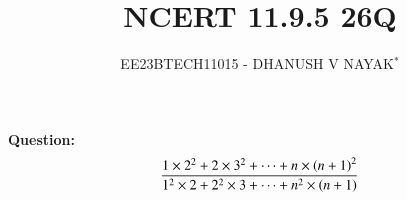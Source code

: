\documentclass[journal,12pt,twocolumn]{IEEEtran}
\theoremstyle{remark}
\begin{document}

\vspace{3cm}

\title{NCERT 11.9.5 26Q}
\author{EE23BTECH11015 - DHANUSH V NAYAK$^{*}$%
}
\maketitle
\newpage
\bigskip

\renewcommand{\thefigure}{\arabic{figure}}
\renewcommand{\thetable}{\theenumi}


\textbf{Question:}
\begin{align}
    \frac{1\times2^2 + 2\times3^2 + \dots + n\times\left(n+1\right)^{2}}{1^2\times2 + 2^2\times3 + \dots + n^2\times \left(n+1\right)}\notag 
\end{align}
\end{document}

